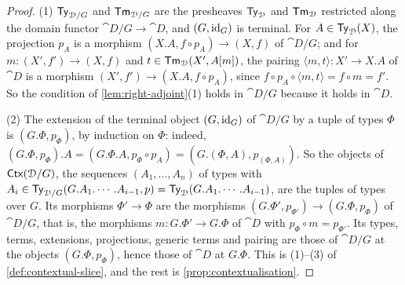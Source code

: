 \begin{proof}
    (1) $\mathsf{Ty}_{\mathcal{D}/G}$ and $\mathsf{Tm}_{\mathcal{D}/G}$ are the presheaves $\mathsf{Ty}_{\mathcal{D}}$ and $\mathsf{Tm}_{\mathcal{D}}$ restricted along the domain functor $\cat{D}/G \to \cat{D}$, and $(G, \mathrm{id}_G)$ is terminal. For $A \in \mathsf{Ty}_{\mathcal{D}}(X)$, the projection $p_A$ is a morphism $(X.A, f \circ p_A) \to (X, f)$ of $\cat{D}/G$; and for $m : (X', f') \to (X, f)$ and $t \in \mathsf{Tm}_{\mathcal{D}}(X', A[m])$, the pairing $\langle m, t \rangle : X' \to X.A$ of $\cat{D}$ is a morphism $(X', f') \to (X.A, f \circ p_A)$, since $f \circ p_A \circ \langle m, t \rangle = f \circ m = f'$. So the condition of \cref{lem:right-adjoint}(1) holds in $\cat{D}/G$ because it holds in $\cat{D}$.

    (2) The extension of the terminal object $(G, \mathrm{id}_G)$ of $\cat{D}/G$ by a tuple of types $\Phi$ is $(G.\Phi, p_\Phi)$, by induction on $\Phi$: indeed, $(G.\Phi, p_\Phi).A = (G.\Phi.A, p_\Phi \circ p_A) = (G.(\Phi, A), p_{(\Phi, A)})$. So the objects of $\mathsf{Ctx}(\mathcal{D}/G)$, the sequences $(A_1, \ldots, A_n)$ of types with $A_i \in \mathsf{Ty}_{\mathcal{D}/G}(G.A_1.\cdots.A_{i-1}, p) = \mathsf{Ty}_{\mathcal{D}}(G.A_1.\cdots.A_{i-1})$, are the tuples of types over $G$. Its morphisms $\Phi' \to \Phi$ are the morphisms $(G.\Phi', p_{\Phi'}) \to (G.\Phi, p_\Phi)$ of $\cat{D}/G$, that is, the morphisms $m : G.\Phi' \to G.\Phi$ of $\cat{D}$ with $p_\Phi \circ m = p_{\Phi'}$. Its types, terms, extensions, projections, generic terms and pairing are those of $\cat{D}/G$ at the objects $(G.\Phi, p_\Phi)$, hence those of $\cat{D}$ at $G.\Phi$. This is (1)--(3) of \cref{def:contextual-slice}, and the rest is \cref{prop:contextualisation}.
\end{proof}

